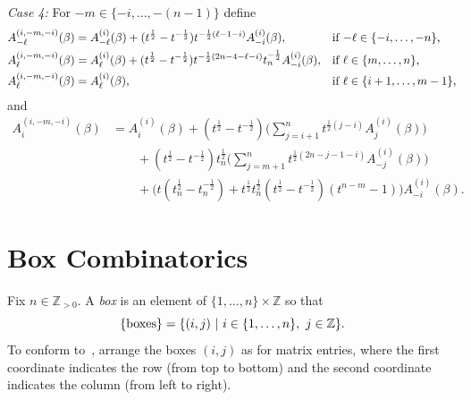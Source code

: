\documentclass[11pt]{article}
\theoremstyle{plain}
\theoremstyle{definition}
\theoremstyle{remark}
\numberwithin{equation}{section}
\def\ZZ{\mathbb{Z}}
\newcounter{r}
\newcounter{s}
\begin{document}
\begin{enumerate}
\begin{equation}
\label{AgencC}
\end{equation}
\emph{Case 4:}  For $-m\in \{-i, \ldots, -(n-1)\}$ define
\begin{align*}
A^{(i,-m,-i)}_{-\ell}(\beta) &= A^{(i)}_{-\ell}(\beta) + (t^{\frac12}-t^{-\frac{1}{2}})t^{-\frac{1}{2}(\ell-1-i)} A^{(i)}_{-i}(\beta), 
&&\hbox{if $-\ell\in \{-i, \ldots, -n\}$,} 
\\
A^{(i,-m,-i)}_{\ell}(\beta) &= A^{(i)}_\ell(\beta) 
+ (t^{\frac12}-t^{-\frac12})t^{-\frac12(2n-4-\ell-i)}t_n^{-\frac12} A^{(i)}_{-i}(\beta), 
&&\hbox{if $\ell\in \{m, \ldots, n\}$,}
\\
A^{(i,-m,-i)}_{\ell}(\beta) &= A^{(i)}_{\ell}(\beta), &&\hbox{if $\ell\in \{i+1, \ldots, m-1\}$,} 
\end{align*}
and 
\begin{align}
A^{(i,-m,-i)}_i(\beta) 
&= A^{(i)}_i(\beta) +  (t^{\frac12}-t^{-\frac12})
\Big(\sum_{j=i+1}^n t^{\frac12(j-i)} A^{(i)}_j(\beta)\Big) 
\nonumber \\
&\qquad + (t^{\frac12} - t^{-\frac12})t_n^{\frac12} \Big(\sum_{j=m+1}^n t^{\frac12(2n-j-1-i)} A^{(i)}_{-j}(\beta) \Big)
\nonumber \\
&\qquad + \Big(
t(t_n^{\frac12}-t_n^{-\frac12}) + t^{\frac12}t_n^{\frac12}(t^{\frac12}-t^{-\frac12}) (t^{n-m}-1)\Big) A^{(i)}_{-i}(\beta).
\label{AgencD}
\end{align}
\end{enumerate}


\section{Box Combinatorics}\label{sec: box combinatorics}

Fix $n\in \ZZ_{>0}$.
A \emph{box} is an element of $\{1,\ldots, n\}\times \ZZ$ so that
$$\{\hbox{boxes}\} = \{ (i,j)\ |\ i\in \{1, \ldots, n\},\ j\in \ZZ \}.$$
To conform to~\cite[p.2]{Mac}, arrange the boxes $(i,j)$ as for matrix entries, where the first coordinate indicates the row 
(from top to bottom) and the second coordinate indicates the column (from left to right). 
\end{document}
